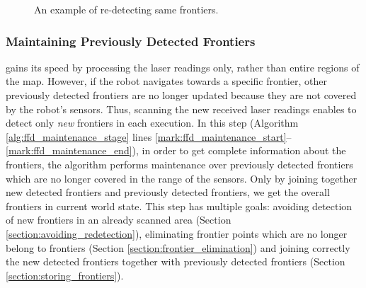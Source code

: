 	\begin{figure}
	 \centering
	 \caption{An example of re-detecting same frontiers.}
	 \label{fig:redetecting_examples}
	\end{figure}


	\subsubsection{Maintaining Previously Detected Frontiers}
	\label{section:ffd_maintaining_previously_detected_frontiers} 
	\FFD
	gains its speed by processing the laser readings only, rather than entire regions of the map.
	However, if the robot navigates towards a specific frontier, other previously
	detected frontiers are no longer updated because they are not covered by
	the robot's sensors. Thus, scanning the new received laser readings enables
	\FFD to detect only \emph{new} frontiers in each execution. In this step
	(Algorithm \ref{alg:ffd_maintenance_stage} lines
	\ref{mark:ffd_maintenance_start}--\ref{mark:ffd_maintenance_end}), in order to
	get complete information about the frontiers, the algorithm performs
	maintenance over previously detected frontiers which are no longer covered in
	the range of the sensors. Only by joining together new detected frontiers and
	previously detected frontiers, we get the overall frontiers in current world
	state. This step has multiple goals: avoiding detection of new frontiers in
	an already scanned area (Section \ref{section:avoiding_redetection}),
	eliminating frontier points which are no longer belong to frontiers (Section
	\ref{section:frontier_elimination}) and joining correctly the new detected
	frontiers together with previously detected frontiers (Section
	\ref{section:storing_frontiers}).

